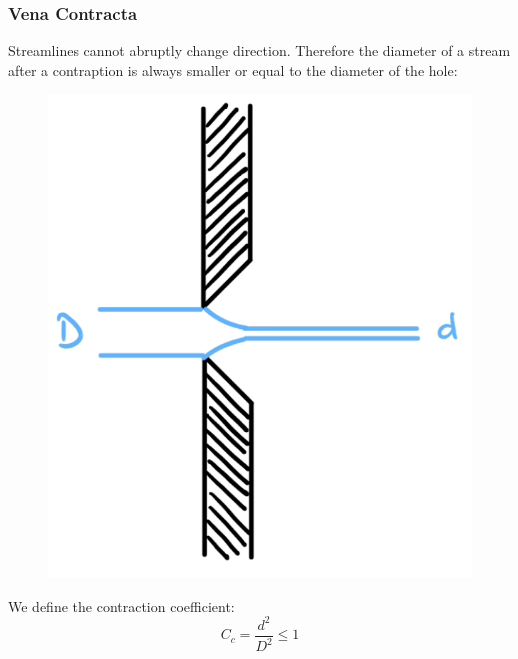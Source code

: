 \subsubsection{Vena Contracta}
Streamlines cannot abruptly change direction. Therefore the diameter of a stream after a contraption is always smaller or equal to the diameter of the hole:
\begin{figure}[H]
	\centering
	\includegraphics[width=0.3\linewidth]{Sketches/VenaContracta}
	\caption{}
	\label{fig:venacontracta}
\end{figure}
We define the contraction coefficient:
\begin{equation*}
	C_c = \frac{d^2}{D^2}\le 1
\end{equation*}
